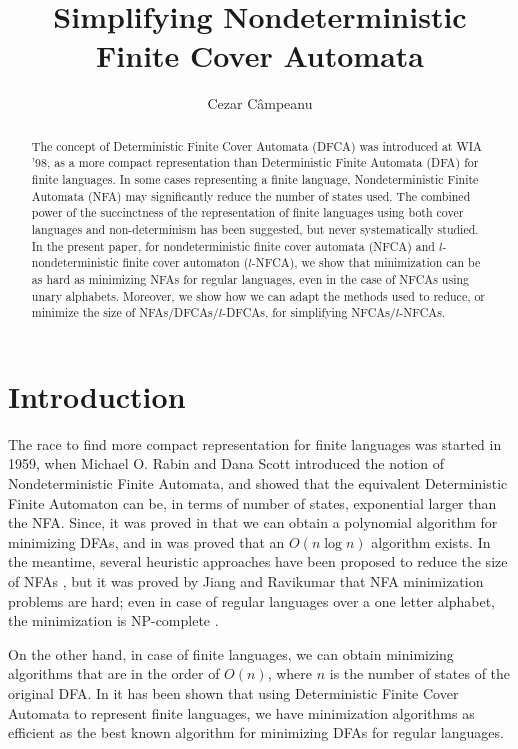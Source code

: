 \documentclass[submission,copyright,creativecommons]{eptcs}
\title{Simplifying Nondeterministic Finite Cover Automata}
\author{Cezar C\^ampeanu
\institute{Department of Computer Science and Information Technology,\\
The University of Prince Edward Island, Canada}
\email{\quad ccampeanu@upei.ca}
}
\begin{document}
\sloppy

\maketitle
\begin{abstract}
The concept of Deterministic Finite Cover Automata (DFCA) was introduced at WIA '98, 
as a more compact representation than Deterministic Finite Automata (DFA) for finite languages.
In some cases representing a finite language, Nondeterministic Finite Automata (NFA) may 
significantly reduce  the number of states used. 
The combined power of the succinctness of the representation of finite languages using 
both cover languages and non-determinism has been suggested, but never  systematically studied. 
In the present paper, for  nondeterministic finite cover automata (NFCA) and $l$-nondeterministic 
finite cover automaton ($l$-NFCA), we show that minimization can be as hard as minimizing NFAs for regular languages, 
even in the case of NFCAs using unary alphabets. Moreover, we show how we can adapt the 
methods used to reduce, or minimize the size of NFAs/DFCAs/$l$-DFCAs, for simplifying NFCAs/$l$-NFCAs.
\end{abstract}
\section{Introduction}

The race to find more compact representation for finite languages was started in 1959, 
when Michael O. Rabin and Dana Scott introduced the notion of Nondeterministic Finite Automata, 
and showed that the equivalent Deterministic Finite Automaton can be, 
in terms of number of states,  exponential larger than the NFA.
Since, it was proved in \cite{moore} that  we can obtain a polynomial algorithm for minimizing
DFAs, and in \cite{hopcroft} was proved that an $O(n\log n)$ algorithm exists.
In the meantime, several heuristic approaches have been proposed to reduce 
the size of NFAs \cite{heuristic,ilieYunfa}, but it was proved by 
Jiang and  Ravikumar \cite{ravikumar} that  NFA minimization problems are
hard; even in case of regular languages over a one letter alphabet, 
the minimization is NP-complete \cite{GruberHolzerNFAHard,ravikumar}.

On the other hand, in case of finite languages, we can obtain minimizing algorithms \cite{maslov,revuz} 
that are in the order of $O(n)$, where $n$ is the number of states of the original DFA.
In \cite{gapIJFCS,CoverAutomata,KornerGoeman} it has been shown that 
using Deterministic Finite Cover Automata to represent finite languages,
we have minimization algorithms as efficient as the best known algorithm for minimizing DFAs 
for regular languages. 
\end{document}
